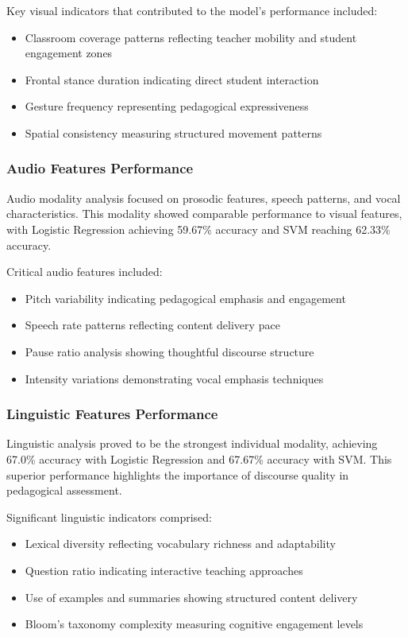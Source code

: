 Key visual indicators that contributed to the model's performance included:
\begin{itemize}
    \item Classroom coverage patterns reflecting teacher mobility and student engagement zones
    \item Frontal stance duration indicating direct student interaction
    \item Gesture frequency representing pedagogical expressiveness
    \item Spatial consistency measuring structured movement patterns
\end{itemize}

\subsubsection{Audio Features Performance}

Audio modality analysis focused on prosodic features, speech patterns, and vocal characteristics. This modality showed comparable performance to visual features, with Logistic Regression achieving 59.67\% accuracy and SVM reaching 62.33\% accuracy.

Critical audio features included:
\begin{itemize}
    \item Pitch variability indicating pedagogical emphasis and engagement
    \item Speech rate patterns reflecting content delivery pace
    \item Pause ratio analysis showing thoughtful discourse structure
    \item Intensity variations demonstrating vocal emphasis techniques
\end{itemize}

\subsubsection{Linguistic Features Performance}

Linguistic analysis proved to be the strongest individual modality, achieving 67.0\% accuracy with Logistic Regression and 67.67\% accuracy with SVM. This superior performance highlights the importance of discourse quality in pedagogical assessment.

Significant linguistic indicators comprised:
\begin{itemize}
    \item Lexical diversity reflecting vocabulary richness and adaptability
    \item Question ratio indicating interactive teaching approaches
    \item Use of examples and summaries showing structured content delivery
    \item Bloom's taxonomy complexity measuring cognitive engagement levels
\end{itemize}

